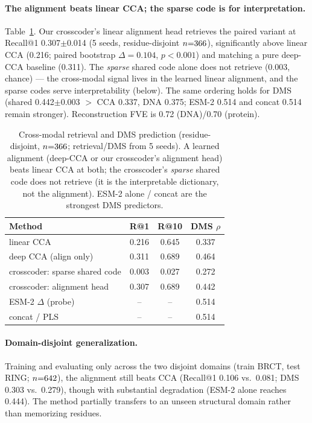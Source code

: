 \paragraph{The alignment beats linear CCA; the sparse code is for interpretation.} Table~\ref{tab:main}. Our crosscoder's linear alignment head retrieves the paired variant at Recall@1 0.307$\pm$0.014 (5 seeds, residue-disjoint $n{=}366{}$), significantly above linear CCA (0.216; paired bootstrap $\Delta{=}0.104$, $p<0.001$) and matching a pure deep-CCA baseline (0.311). The \emph{sparse} shared code alone does not retrieve (0.003, chance) --- the cross-modal signal lives in the learned linear alignment, and the sparse codes serve interpretability (below). The same ordering holds for DMS (shared 0.442$\pm$0.003 $>$ CCA 0.337, DNA 0.375; ESM-2 0.514 and concat 0.514 remain stronger). Reconstruction FVE is 0.72 (DNA)/0.70 (protein).
\begin{table}[t]\centering\small
\caption{Cross-modal retrieval and DMS prediction (residue-disjoint, $n{=}366{}$; retrieval/DMS from 5 seeds). A learned alignment (deep-CCA or our crosscoder's alignment head) beats linear CCA at both; the crosscoder's \emph{sparse} shared code does not retrieve (it is the interpretable dictionary, not the alignment). ESM-2 alone / concat are the strongest DMS predictors.}\label{tab:main}
\begin{tabular}{lccc}
\toprule
Method & R@1 & R@10 & DMS $\rho$ \\
\midrule
linear CCA & 0.216 & 0.645 & 0.337 \\
deep CCA (align only) & 0.311 & 0.689 & 0.464 \\
\;crosscoder: sparse shared code & 0.003 & 0.027 & 0.272 \\
\;crosscoder: alignment head & 0.307 & 0.689 & 0.442 \\
ESM-2 $\Delta$ (probe) & -- & -- & 0.514 \\
concat / PLS & -- & -- & 0.514 \\
\bottomrule
\end{tabular}
\end{table}

\paragraph{Domain-disjoint generalization.} Training and evaluating only across the two disjoint domains (train BRCT, test RING; $n{=}642{}$), the alignment still beats CCA (Recall@1 0.106 vs.\ 0.081; DMS 0.303 vs.\ 0.279), though with substantial degradation (ESM-2 alone reaches 0.444). The method partially transfers to an unseen structural domain rather than memorizing residues.

